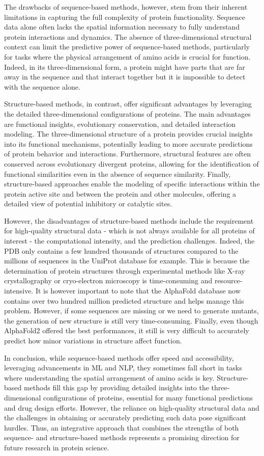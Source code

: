 The drawbacks of sequence-based methods, however, stem from their inherent limitations in capturing the full complexity of protein functionality. Sequence data alone often lacks the spatial information necessary to fully understand protein interactions and dynamics. The absence of three-dimensional structural context can limit the predictive power of sequence-based methods, particularly for tasks where the physical arrangement of amino acids is crucial for function. Indeed, in its three-dimensional form, a protein might have parts that are far away in the sequence and that interact together but it is impossible to detect with the sequence alone. 

Structure-based methods, in contrast, offer significant advantages by leveraging the detailed three-dimensional configurations of proteins. The main advantages are functional insights, evolutionary conservation, and detailed interaction modeling. The three-dimensional structure of a protein provides crucial insights into its functional mechanisms, potentially leading to more accurate predictions of protein behavior and interactions. Furthermore, structural features are often conserved across evolutionary divergent proteins, allowing for the identification of functional similarities even in the absence of sequence similarity. Finally, structure-based approaches enable the modeling of specific interactions within the protein active site and between the protein and other molecules, offering a detailed view of potential inhibitory or catalytic sites.

However, the disadvantages of structure-based methods include the requirement for high-quality structural data - which is not always available for all proteins of interest - the computational intensity, and the prediction challenges. Indeed, the PDB only contains a few hundred thousands of structures compared to the millions of sequences in the UniProt database for example. This is because the determination of protein structures through experimental methods like X-ray crystallography or cryo-electron microscopy is time-consuming and resource-intensive. It is however important to note that the AlphaFold database now contains over two hundred million predicted structure and helps manage this problem. However, if some sequences are missing or we need to generate mutants, the generation of new structure is still very time-consuming. Finally, even though AlphaFold2 offered the best performances, it still is very difficult to accurately predict how minor variations in structure affect function. \cite{Buel2022AlphaFold}

In conclusion, while sequence-based methods offer speed and accessibility, leveraging advancements in ML and NLP, they sometimes fall short in tasks where understanding the spatial arrangement of amino acids is key. Structure-based methods fill this gap by providing detailed insights into the three-dimensional configurations of proteins, essential for many functional predictions and drug design efforts. However, the reliance on high-quality structural data and the challenges in obtaining or accurately predicting such data pose significant hurdles. Thus, an integrative approach that combines the strengths of both sequence- and structure-based methods represents a promising direction for future research in protein science.